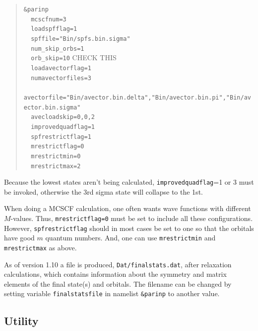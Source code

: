 \documentclass[10pt,leqno, oneside]{book}
\begin{document}
\begin{quote}
{\footnotesize
\verb#&parinp# \\
\verb#  mcscfnum=3# \\
\verb#  loadspfflag=1# \\
\verb#  spffile="Bin/spfs.bin.sigma"# \\
\verb#  num_skip_orbs=1# \\
\verb#  orb_skip=10#   \qquad CHECK THIS \\
\verb#  loadavectorflag=1# \\
\verb#  numavectorfiles=3# \\
\verb#  avectorfile="Bin/avector.bin.delta","Bin/avector.bin.pi","Bin/avector.bin.sigma"# \\
\verb#  avecloadskip=0,0,2# \\
\verb#  improvedquadflag=1# \\
\verb#  spfrestrictflag=1 # \\
\verb#  mrestrictflag=0 # \\
\verb#  mrestrictmin=0 # \\
\verb#  mrestrictmax=2 # \\
}\end{quote}
Because the
lowest states aren't being calculated, \verb#improvedquadflag#=1 or 3 must be invoked, otherwise the 3rd sigma state will collapse to the 1st.

When doing a MCSCF calculation, one often wants wave functions with different $M$-values.  Thus, \verb#mrestrictflag=0# must be set to include all these configurations.  However, \verb#spfrestrictflag# should in most cases be set to one so that the orbitals have good $m$ quantum numbers.  And, one can use
\verb#mrestrictmin# and \verb#mrestrictmax# as above.

As of version 1.10 a file is produced, \verb#Dat/finalstats.dat#, after relaxation calculations, which contains information about the symmetry and matrix elements of the final
state(s) and orbitals.  The filename can be changed by setting variable \verb#finalstatsfile# in namelist \verb#&parinp# to another value.

\subsection{Utility}
\end{document}
